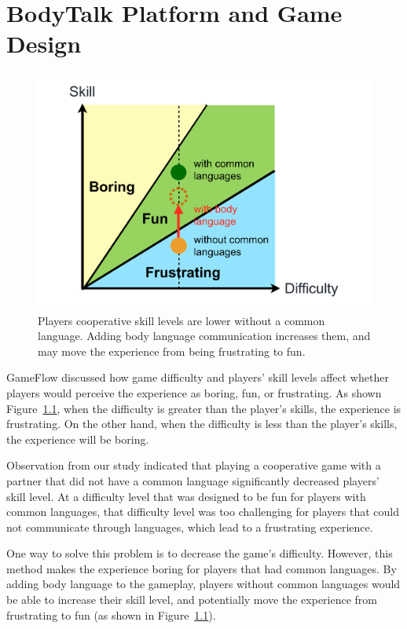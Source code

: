 \chapter{BodyTalk Platform and Game Design}

\begin{figure}[!h]
\centering
\includegraphics[width=0.9\columnwidth]{Figures/GD_F1.pdf}
\caption{Players cooperative skill levels are lower without a common language. Adding body language communication increases them, and may move the experience from being frustrating to fun.}
\label{fig:GD_F1}
\end{figure}

GameFlow\cite{GD1} discussed how game difficulty and players' skill levels affect whether players would perceive the experience as boring, fun, or frustrating. As shown Figure~\ref{fig:GD_F1}, when the difficulty is greater than the player's skills, the experience is frustrating. On the other hand, when the difficulty is less than the player's skills, the experience will be boring.



Observation from our study indicated that playing a cooperative game with a partner that did not have a common language significantly decreased players' skill level. At a difficulty level that was designed to be fun for players with common languages, that difficulty level was too challenging for players that could not communicate through languages, which lead to a frustrating experience. 

One way to solve this problem is to decrease the game's difficulty. However, this method makes the experience boring for players that had common languages. By adding body language to the gameplay, players without common languages would be able to increase their skill level, and potentially move the experience from frustrating to fun (as shown in Figure~\ref{fig:GD_F1}).  

